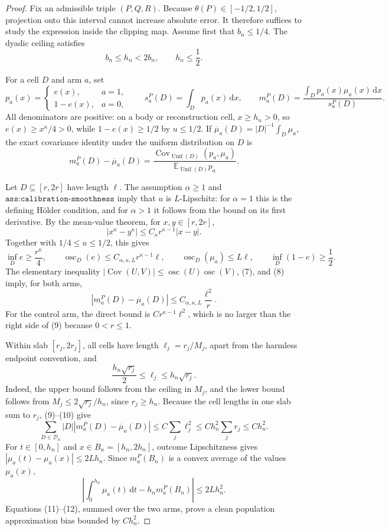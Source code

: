 \documentclass{article}
\begin{document}
\begin{proof}
Fix an admissible triple \((P,Q,R)\). Because \(\theta(P)\in[-1/2,1/2]\), projection onto this interval cannot increase absolute error. It therefore suffices to study the expression inside the clipping map. Assume first that \(b_n\leq1/4\). The dyadic ceiling satisfies
\[
b_n\leq h_n<2b_n,
\qquad h_n\leq\frac12.
\tag{6}
\]

For a cell \(D\) and arm \(a\), set
\[
p_a(x)=
\begin{cases}e(x),&a=1,\\1-e(x),&a=0,\end{cases}
\qquad
s_a^P(D)=\int_Dp_a(x)\,\mathrm dx,
\qquad
m_a^P(D)=\frac{\int_Dp_a(x)\mu_a(x)\,\mathrm dx}{s_a^P(D)}.
\]
All denominators are positive: on a body or reconstruction cell, \(x\geq h_n>0\), so \(e(x)\geq x^\kappa/4>0\), while \(1-e(x)\geq1/2\) by \(u\leq1/2\). If \(\overline\mu_a(D)=|D|^{-1}\int_D\mu_a\), the exact covariance identity under the uniform distribution on \(D\) is
\[
m_a^P(D)-\overline\mu_a(D)
=\frac{\operatorname{Cov}_{\operatorname{Unif}(D)}(p_a,\mu_a)}
{\mathbb E_{\operatorname{Unif}(D)}p_a}.
\tag{7}
\]

Let \(D\subseteq[r,2r]\) have length \(\ell\). The assumption \(\alpha\geq1\) and \(\texttt{ass:calibration-smoothness}\) imply that \(u\) is \(L\)-Lipschitz: for \(\alpha=1\) this is the defining Hölder condition, and for \(\alpha>1\) it follows from the bound on its first derivative. By the mean-value theorem, for \(x,y\in[r,2r]\),
\[
|x^\kappa-y^\kappa|\leq C_\kappa r^{\kappa-1}|x-y|.
\]
Together with \(1/4\leq u\leq1/2\), this gives
\[
\inf_De\geq\frac{r^\kappa}{4},
\qquad
\operatorname{osc}_D(e)\leq C_{\alpha,\kappa,L}r^{\kappa-1}\ell,
\qquad
\operatorname{osc}_D(\mu_a)\leq L\ell,
\qquad
\inf_D(1-e)\geq\frac12.
\tag{8}
\]
The elementary inequality \(|\operatorname{Cov}(U,V)|\leq\operatorname{osc}(U)\operatorname{osc}(V)\), (7), and (8) imply, for both arms,
\[
|m_a^P(D)-\overline\mu_a(D)|
\leq C_{\alpha,\kappa,L}\frac{\ell^2}{r}.
\tag{9}
\]
For the control arm, the direct bound is \(C r^{\kappa-1}\ell^2\), which is no larger than the right side of (9) because \(0<r\leq1\).

Within slab \([r_j,2r_j]\), all cells have length \(\ell_j=r_j/M_j\), apart from the harmless endpoint convention, and
\[
\frac{h_n\sqrt{r_j}}2\leq\ell_j\leq h_n\sqrt{r_j}.
\tag{10}
\]
Indeed, the upper bound follows from the ceiling in \(M_j\), and the lower bound follows from \(M_j\leq2\sqrt{r_j}/h_n\), since \(r_j\geq h_n\). Because the cell lengths in one slab sum to \(r_j\), (9)--(10) give
\[
\sum_{D\in\mathcal D_n}|D|
|m_a^P(D)-\overline\mu_a(D)|
\leq C\sum_j\ell_j^2
\leq Ch_n^2\sum_jr_j
\leq Ch_n^2.
\tag{11}
\]
For \(t\in[0,h_n]\) and \(x\in B_n=[h_n,2h_n]\), outcome Lipschitzness gives \(|\mu_a(t)-\mu_a(x)|\leq2Lh_n\). Since \(m_a^P(B_n)\) is a convex average of the values \(\mu_a(x)\),
\[
\left|\int_0^{h_n}\mu_a(t)\,\mathrm dt-h_nm_a^P(B_n)\right|
\leq2Lh_n^2.
\tag{12}
\]
Equations (11)--(12), summed over the two arms, prove a clean population approximation bias bounded by \(Ch_n^2\).


\end{proof}
\end{document}

